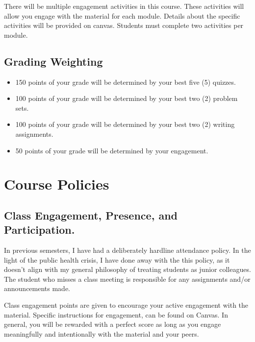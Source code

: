 \documentclass[11pt,]{article}
\providecommand{\tightlist}{%
  \setlength{\itemsep}{0pt}\setlength{\parskip}{0pt}}
\begin{document}
There will be multiple engagement activities in this course. These
activities will allow you engage with the material for each module.
Details about the specific activities will be provided on canvas.
Students must complete two activities per module.

\hypertarget{grading-weighting}{%
\subsection{Grading Weighting}\label{grading-weighting}}

\begin{itemize}
\tightlist
\item
  150 points of your grade will be determined by your best five (5)
  quizzes.
\item
  100 points of your grade will be determined by your best two (2)
  problem sets.
\item
  100 points of your grade will be determined by your best two (2)
  writing assignments.
\item
  50 points of your grade will be determined by your engagement.
\end{itemize}

\hypertarget{course-policies}{%
\section{Course Policies}\label{course-policies}}

\hypertarget{class-engagement-presence-and-participation.}{%
\subsection{Class Engagement, Presence, and
Participation.}\label{class-engagement-presence-and-participation.}}

In previous semesters, I have had a deliberately hardline attendance
policy. In the light of the public health crisis, I have done away with
the this policy, as it doesn't align with my general philosophy of
treating students as junior colleagues. The student who misses a class
meeting is responsible for any assignments and/or announcements made.

Class engagement points are given to encourage your active engagement
with the material. Specific instructions for engagement, can be found on
Canvas. In general, you will be rewarded with a perfect score as long as
you engage meaningfully and intentionally with the material and your
peers.
\end{document}
